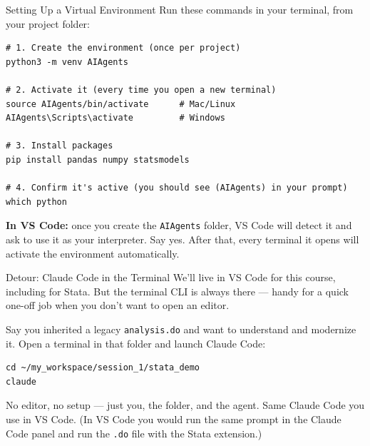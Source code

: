 \documentclass[aspectratio=169, 11pt]{beamer}
\begin{document}
\begin{frame}[fragile]{Setting Up a Virtual Environment}
  Run these commands in your terminal, from your project folder:

  \vspace{0.5em}
\begin{lstlisting}[keepspaces=true]
# 1. Create the environment (once per project)
python3 -m venv AIAgents

# 2. Activate it (every time you open a new terminal)
source AIAgents/bin/activate      # Mac/Linux
AIAgents\Scripts\activate         # Windows

# 3. Install packages
pip install pandas numpy statsmodels

# 4. Confirm it's active (you should see (AIAgents) in your prompt)
which python
\end{lstlisting}

  \vspace{0.3em}
  \textbf{In VS Code:} once you create the \texttt{AIAgents} folder, VS Code will detect it and ask to use it as your interpreter. Say yes. After that, every terminal it opens will activate the environment automatically.
\end{frame}


\begin{frame}[fragile]{Detour: Claude Code in the Terminal}
  We'll live in VS Code for this course, including for Stata. But the terminal CLI is always there --- handy for a quick one-off job when you don't want to open an editor.

  \vspace{0.5em}
  Say you inherited a legacy \texttt{analysis.do} and want to understand and modernize it. Open a terminal in that folder and launch Claude Code:

  \vspace{0.3em}
\begin{lstlisting}
cd ~/my_workspace/session_1/stata_demo
claude
\end{lstlisting}

  \vspace{0.3em}
  No editor, no setup --- just you, the folder, and the agent. Same Claude Code you use in VS Code. (In VS Code you would run the same prompt in the Claude Code panel and run the \texttt{.do} file with the Stata extension.)
\end{frame}
\end{document}
